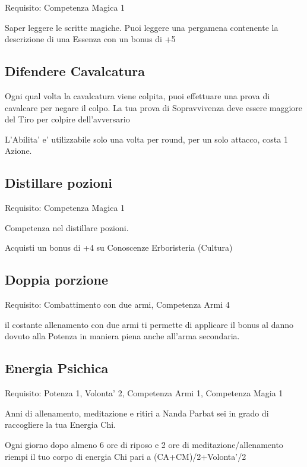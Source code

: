 \documentclass[a4paper,11pt,twoside,openany]{book}
\begin{document}
Requisito: Competenza Magica 1

Saper leggere le scritte magiche. Puoi leggere una pergamena contenente la descrizione di una Essenza con un bonus di +5

\subsection{Difendere Cavalcatura}

Ogni qual volta la cavalcatura viene colpita, puoi effettuare una prova di cavalcare per negare il colpo. La tua prova di Sopravvivenza deve essere maggiore del Tiro per colpire dell'avversario

L'Abilita' e' utilizzabile solo una volta per round, per un solo attacco, costa 1 Azione.

\subsection{Distillare pozioni}

Requisito: Competenza Magica 1

Competenza nel distillare pozioni.

Acquisti un bonus di +4 su Conoscenze Erboristeria (Cultura)

\subsection{Doppia porzione}

Requisito: Combattimento con due armi, Competenza Armi 4

il costante allenamento con due armi ti permette di applicare il bonus al danno dovuto alla Potenza in maniera piena anche all'arma secondaria. 

\subsection{Energia Psichica}

Requisito: Potenza 1, Volonta' 2, Competenza Armi 1, Competenza Magia
1

Anni di allenamento, meditazione e ritiri a Nanda Parbat sei in grado di raccogliere la tua Energia Chi.

Ogni giorno dopo almeno 6 ore di riposo e 2 ore di meditazione/allenamento riempi il tuo corpo di energia Chi pari a (CA+CM)/2+Volonta'/2
\end{document}
